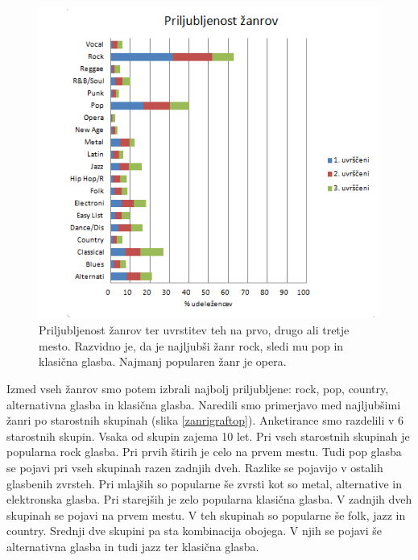 \documentclass[a4paper, 12pt]{book}
\begin{document}
{\begin{figure}[hbt]
\centering
\includegraphics[width=13cm]{images/genre.png}

\caption{Priljubljenost žanrov ter uvrstitev teh na prvo, drugo ali tretje mesto. Razvidno je, da je najljubši žanr rock, sledi mu pop in klasična glasba. Najmanj popularen žanr je opera.}
\label{zanrigraf}
\end{figure}

Izmed vseh žanrov smo potem izbrali najbolj priljubljene: rock, pop, country, alternativna glasba in klasična glasba. Naredili smo primerjavo med najljubšimi žanri po starostnih skupinah (slika \ref{zanrigraftop}). Anketirance smo razdelili v 6 starostnih skupin. Vsaka od skupin zajema 10 let. Pri vseh starostnih skupinah je popularna rock glasba. Pri prvih štirih je celo na prvem mestu. Tudi pop glasba se pojavi pri vseh skupinah razen zadnjih dveh. Razlike se pojavijo v ostalih glasbenih zvrsteh. Pri mlajših so popularne še zvrsti kot so metal, alternative in elektronska glasba. Pri starejših je zelo popularna klasična glasba. V zadnjih dveh skupinah se pojavi na prvem mestu. V teh skupinah so popularne še folk, jazz in country. Srednji dve skupini pa sta kombinacija obojega. V njih se pojavi še alternativna glasba in tudi jazz ter klasična glasba. 

}
\end{document}
